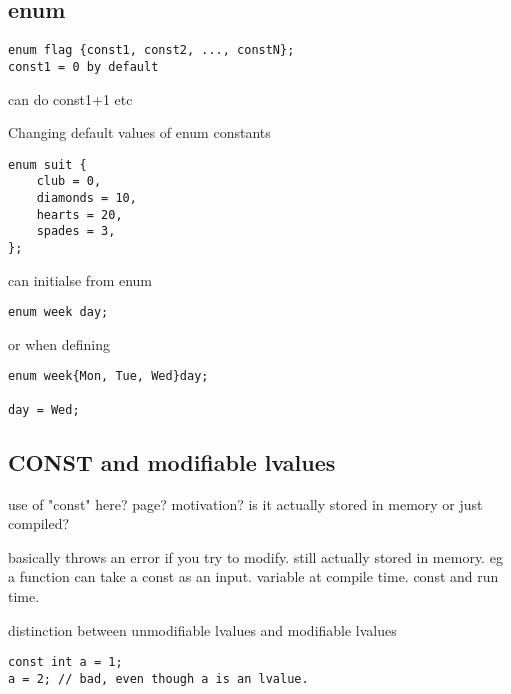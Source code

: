 
\subsection{enum}

\begin{verbatim}
enum flag {const1, const2, ..., constN};
const1 = 0 by default
\end{verbatim}

can do const1+1 etc

Changing default values of enum constants

\begin{verbatim}
enum suit {
    club = 0,
    diamonds = 10,
    hearts = 20,
    spades = 3,
};
\end{verbatim}

can initialse from enum
\begin{verbatim}
enum week day;
\end{verbatim}

or when defining
\begin{verbatim}
enum week{Mon, Tue, Wed}day;

day = Wed;
\end{verbatim}

\subsection{CONST and modifiable lvalues}

use of "const" here? page? motivation? is it actually stored in memory or just compiled?

basically throws an error if you try to modify. still actually stored in memory. eg a function can take a const as an input. variable at compile time. const and run time.

distinction between unmodifiable lvalues and modifiable lvalues
\begin{verbatim}
const int a = 1;
a = 2; // bad, even though a is an lvalue.
\end{verbatim}

